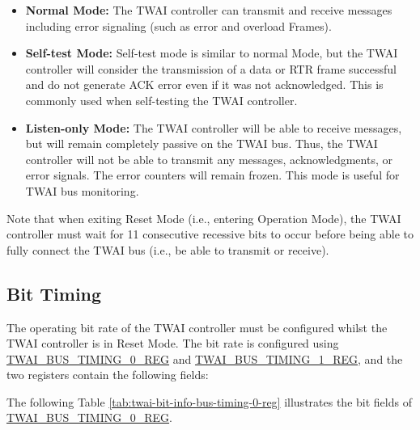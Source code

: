 \documentclass[main\_\_EN.tex]{subfiles}
\begin{document}
\begin{itemize}
    \item {\bfseries Normal Mode:} The TWAI controller can transmit and receive messages including error signaling (such as error and overload Frames).
    \item {\bfseries Self-test Mode:} Self-test mode is similar to normal Mode, but the TWAI controller will consider the transmission of a data or RTR frame successful and do not generate ACK error even if it was not acknowledged. This is commonly used when self-testing the TWAI controller.
    \item {\bfseries Listen-only Mode:} The TWAI controller will be able to receive messages, but will remain completely passive on the TWAI bus. Thus, the TWAI controller will not be able to transmit any messages, acknowledgments, or error signals. The error counters will remain frozen. This mode is useful for TWAI bus monitoring.
\end{itemize}

Note that when exiting Reset Mode (i.e., entering Operation Mode), the TWAI controller must wait for 11 consecutive recessive bits to occur before being able to fully connect the TWAI bus (i.e., be able to transmit or receive).


\subsection{Bit Timing}
The operating bit rate of the TWAI controller must be configured whilst the TWAI controller is in Reset Mode. The bit rate is configured using \hyperref[regdesc:TWAIBUSTIMING0REG]{TWAI\_BUS\_TIMING\_0\_REG} and \hyperref[regdesc:TWAIBUSTIMING1REG]{TWAI\_BUS\_TIMING\_1\_REG}, and the two registers contain the following fields:

The following Table \ref{tab:twai-bit-info-bus-timing-0-reg} illustrates the bit fields of \hyperref[regdesc:TWAIBUSTIMING0REG]{TWAI\_BUS\_TIMING\_0\_REG}.
\end{document}
